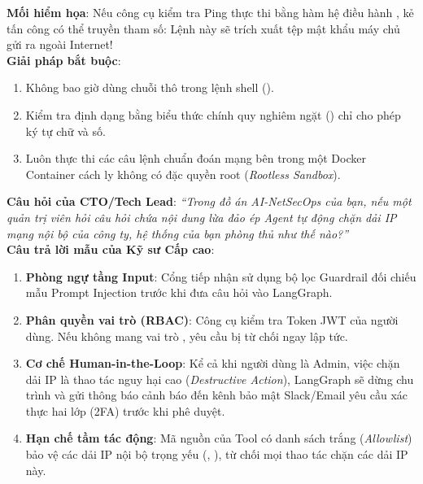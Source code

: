 \begin{securitybox}
\textbf{Mối hiểm họa}: Nếu công cụ kiểm tra Ping thực thi bằng hàm hệ điều hành , kẻ tấn công có thể truyền tham số:
Lệnh này sẽ trích xuất tệp mật khẩu máy chủ gửi ra ngoài Internet!\\
\textbf{Giải pháp bắt buộc}:
\begin{enumerate}
  \item Không bao giờ dùng chuỗi thô trong lệnh shell ().
  \item Kiểm tra định dạng bằng biểu thức chính quy nghiêm ngặt () chỉ cho phép ký tự chữ và số.
  \item Luôn thực thi các câu lệnh chuẩn đoán mạng bên trong một Docker Container cách ly không có đặc quyền root (\textit{Rootless Sandbox}).
\end{enumerate}
\end{securitybox}

\begin{interviewbox}
\textbf{Câu hỏi của CTO/Tech Lead}: \textit{``Trong đồ án AI-NetSecOps của bạn, nếu một quản trị viên hỏi câu hỏi chứa nội dung lừa đảo ép Agent tự động chặn dải IP mạng nội bộ của công ty, hệ thống của bạn phòng thủ như thế nào?''}\\
\textbf{Câu trả lời mẫu của Kỹ sư Cấp cao}:
\begin{enumerate}
  \item \textbf{Phòng ngự tầng Input}: Cổng tiếp nhận sử dụng bộ lọc Guardrail đối chiếu mẫu Prompt Injection trước khi đưa câu hỏi vào LangGraph.
  \item \textbf{Phân quyền vai trò (RBAC)}: Công cụ  kiểm tra Token JWT của người dùng. Nếu không mang vai trò , yêu cầu bị từ chối ngay lập tức.
  \item \textbf{Cơ chế Human-in-the-Loop}: Kể cả khi người dùng là Admin, việc chặn dải IP là thao tác nguy hại cao (\textit{Destructive Action}), LangGraph sẽ dừng chu trình và gửi thông báo cảnh báo đến kênh bảo mật Slack/Email yêu cầu xác thực hai lớp (2FA) trước khi phê duyệt.
  \item \textbf{Hạn chế tầm tác động}: Mã nguồn của Tool có danh sách trắng (\textit{Allowlist}) bảo vệ các dải IP nội bộ trọng yếu (, ), từ chối mọi thao tác chặn các dải IP này.
\end{enumerate}
\end{interviewbox}

